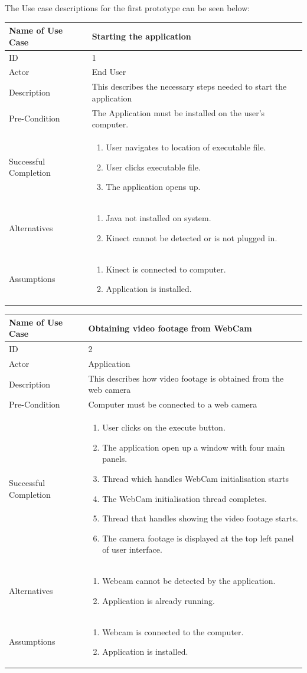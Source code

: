 \documentclass[a4paper, 12pt]{article}
\newcommand\addrow[2]{#1 &#2\\ }
\newcommand\addheading[2]{#1 &#2\\ \hline}
\newcommand\tabularhead{\begin{tabular}{lp{8cm}}
\hline
}
\newcommand\addmulrow[2]{ \begin{minipage}[t][][t]{2.5cm}#1\end{minipage}%
   &\begin{minipage}[t][][t]{8cm}
    \begin{enumerate} #2   \end{enumerate}
    \end{minipage}\\ }
\newenvironment{usecase}{\tabularhead}
{\hline\end{tabular}}
\begin{document}
The Use case descriptions for the first prototype can be seen below:

\begin{usecase}
	\addheading{Name of Use Case}{Starting the application}
	\addrow{ID}{1}
	\addrow{Actor}{End User}
	\addrow{Description}{This describes the necessary steps needed to start the application}
	\addrow{Pre-Condition}{The Application must be installed on the user's computer.}
	\addmulrow{Successful Completion}{
		\item User navigates to location of executable file. 
		\item User clicks executable file. 
		\item The application opens up.}
	\addmulrow{Alternatives}{
	\item Java not installed on system. 
	\item Kinect cannot be detected or is not plugged in.}
	\addmulrow{Assumptions}{
	\item Kinect is connected to computer. 
	\item Application is installed.}
\end{usecase}

\begin{usecase}
	\addheading{Name of Use Case}{Obtaining video footage from WebCam}
	\addrow{ID}{2}
	\addrow{Actor}{Application}
	\addrow{Description}{This describes how video footage is obtained from the web camera}
	\addrow{Pre-Condition}{Computer must be connected to a web camera}
	\addmulrow{Successful Completion}{
		\item User clicks on the execute button. 
		\item The application open up a window with four main panels. 
		\item Thread which handles WebCam initialisation starts
		\item The WebCam initialisation thread completes. 
		\item Thread that handles showing the video footage starts.
		\item The camera footage is displayed at the top left panel of user interface.}
	\addmulrow{Alternatives}{
	\item Webcam cannot be detected by the application.
	\item Application is already running.}
	\addmulrow{Assumptions}{
	\item Webcam is connected to the computer. 
	\item Application is installed.}
\end{usecase}
\end{document}

